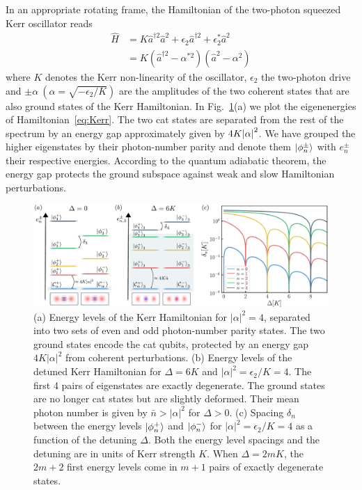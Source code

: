 \documentclass[%
 reprint,
 superscriptaddress,
 amsmath,
 amssymb,
 aps,
 pra,
 10pt
]{revtex4-2}
\begin{document}
In an appropriate rotating frame, the Hamiltonian of the two-photon squeezed Kerr oscillator reads~\cite{Puri2017}
\begin{equation}\label{eq:Kerr}
    \begin{split}
        \hat{H} &= K\hat{a}^{\dagger 2}\hat{a}^{ 2} + \epsilon_2 \hat{a}^{\dagger 2} + \epsilon_2^* \hat{a}^{2} \\
        &= K(\hat{a}^{\dagger 2} - \alpha^{*2})(\hat{a}^{ 2} - \alpha^2)
    \end{split}
\end{equation}
where $K$ denotes the Kerr non-linearity of the oscillator, $\epsilon_2$ the two-photon drive and $\pm \alpha\ (\alpha = \sqrt{-\epsilon_2/K})$ are the amplitudes of the two coherent states that are also ground states of the Kerr Hamiltonian. In Fig.~\ref{fig:arche}(a) we plot the eigenenergies of Hamiltonian~\eqref{eq:Kerr}. The two cat states are separated from the rest of the spectrum by an energy gap approximately given by $4 K \abs{\alpha}^2 $. We have grouped the higher eigenstates by their photon-number parity and denote them $\ket{\phi_n^\pm}$ with $e^\pm_n$ their respective energies. According to the quantum adiabatic theorem, the energy gap protects the ground subspace against weak and slow Hamiltonian perturbations.

\begin{figure}[t!]
    \centering
    \includegraphics[width=\textwidth]{image/Spectre_V3.pdf}
    \vspace{-0.5cm}
    \caption{\label{fig:arche}
    (a) Energy levels of the Kerr Hamiltonian for $|\alpha|^2=4$, separated into two sets of even and odd photon-number parity states. The two ground states encode the cat qubits, protected by an energy gap $4 K |\alpha|^2$ from coherent perturbations. (b) Energy levels of the detuned Kerr Hamiltonian for $\Delta = 6K$ and $|\alpha|^2=\epsilon_2/K=4$. The first 4 pairs of eigenstates are exactly degenerate. The ground states are no longer cat states but are slightly deformed. Their mean photon number is given by $\bar n>|\alpha|^2$ for $\Delta>0$. (c) Spacing $\delta_n$ between the energy levels $\ket{\phi_n^+}$ and $\ket{\phi_n^-}$ for $|\alpha|^2=\epsilon_2/K=4$ as a function of the detuning $\Delta$. Both the energy level spacings and the detuning are in units of Kerr strength $K$. When $\Delta = 2mK$, the $2m+2$ first energy levels come in $m+1$ pairs of exactly degenerate states.
    }
\end{figure}
\end{document}
